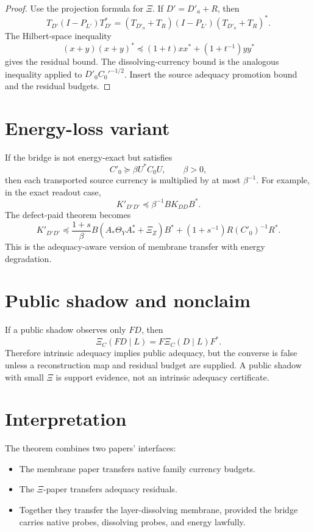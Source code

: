 \documentclass[11pt]{article}
\begin{document}
\begin{proof}
Use the projection formula for \(\Xi\).  If \(D'=D'_a+R\), then
\[
T_{D'}(I-P_{L'})T_{D'}^*
=(T_{D'_a}+T_R)(I-P_{L'})(T_{D'_a}+T_R)^*.
\]
The Hilbert-space inequality
\[
(x+y)(x+y)^*\preceq(1+t)xx^*+(1+t^{-1})yy^*
\]
gives the residual bound.  The dissolving-currency bound is the analogous inequality applied to \(D'_0C_0'^{-1/2}\).  Insert the source adequacy promotion bound and the residual budgets.
\end{proof}

\section{Energy-loss variant}
If the bridge is not energy-exact but satisfies
\[
C'_0\succeq \beta U^*C_0U,
\qquad \beta>0,
\]
then each transported source currency is multiplied by at most \(\beta^{-1}\).  For example, in the exact readout case,
\[
K'_{D'D'}\preceq \beta^{-1}B K_{DD}B^*.
\]
The defect-paid theorem becomes
\[
K'_{D'D'}\preceq
\frac{1+s}{\beta}B(A_*\Theta_YA_*^*+\Xi_Z)B^*
+(1+s^{-1})R(C'_0)^{-1}R^*.
\]
This is the adequacy-aware version of membrane transfer with energy degradation.

\section{Public shadow and nonclaim}
If a public shadow observes only \(F D\), then
\[
\Xi_C(FD\mid L)=F\Xi_C(D\mid L)F^*.
\]
Therefore intrinsic adequacy implies public adequacy, but the converse is false unless a reconstruction map and residual budget are supplied.  A public shadow with small \(\Xi\) is support evidence, not an intrinsic adequacy certificate.

\section{Interpretation}
The theorem combines two papers' interfaces:
\begin{itemize}[leftmargin=2em]
\item The membrane paper transfers native family currency budgets.
\item The \(\Xi\)-paper transfers adequacy residuals.
\item Together they transfer the layer-dissolving membrane, provided the bridge carries native probes, dissolving probes, and energy lawfully.
\end{itemize}
\end{document}
